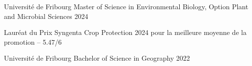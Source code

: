 

\begin{cventries}

  \cventrynoloc
    {Université de Fribourg} %
    {Master of Science in Environmental Biology, Option Plant and Microbial Sciences} %
    {2024} %
    {
      \begin{cvitems} %
        \item {Lauréat du Prix Syngenta Crop Protection 2024 pour la meilleure moyenne de la promotion -- 5.47/6}
      \end{cvitems}
    }

  \cventrynoloc
    {Université de Fribourg} %
    {Bachelor of Science in Geography} %
    {2022} %
    {}

\end{cventries}
